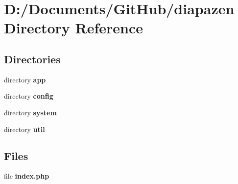 \section{D\-:/\-Documents/\-Git\-Hub/diapazen Directory Reference}
\label{dir_6b560526f5b1e9ef2e0dac1c17416942}
\subsection*{Directories}
\begin{DoxyCompactItemize}
\item 
directory {\bf app}
\item 
directory {\bf config}
\item 
directory {\bf system}
\item 
directory {\bf util}
\end{DoxyCompactItemize}
\subsection*{Files}
\begin{DoxyCompactItemize}
\item 
file {\bfseries index.\-php}
\end{DoxyCompactItemize}
